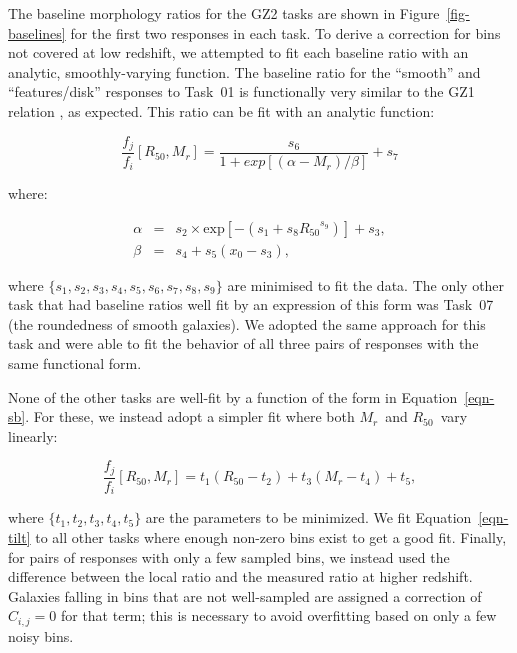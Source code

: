 \documentclass[useAMS,usenatbib]{mn2e}
\newcommand{\mr}{$M_r$}
\newcommand{\rfifty}{$R_{50}$}
\begin{document}
The baseline morphology ratios for the GZ2 tasks are shown in Figure~\ref{fig-baselines} for the first two responses in each task. To derive a correction for bins not covered at low redshift, we attempted to fit each baseline ratio with an analytic, smoothly-varying function. The baseline ratio for the ``smooth'' and ``features/disk'' responses to Task~01 is functionally very similar to the GZ1 relation \citep[Figure~A5 in][]{bam09}, as expected. This ratio can be fit with an analytic function: 

\begin{equation}
\frac{f_j}{f_i}[R_{50},M_r] = \frac{s_6}{1 + exp[(\alpha - M_r)/\beta]} + s_7
\label{eqn-sb}
\end{equation}

\noindent where:

\begin{eqnarray}
\alpha &=& s_2\times\text{exp}[{-\left(s_1 + s_8{R_{50}}^{s_9}\right)}] + s_3, \\
\beta  &=& s_4 + s_5(x_0 - s_3),
\end{eqnarray}

\noindent where $\{s_1,s_2,s_3,s_4,s_5,s_6,s_7,s_8,s_9\}$ are minimised to fit the data. The only other task that had baseline ratios well fit by an expression of this form was Task~07 (the roundedness of smooth galaxies). We adopted the same approach for this task and were able to fit the behavior of all three pairs of responses with the same functional form. 

None of the other tasks are well-fit by a function of the form in Equation~\ref{eqn-sb}. For these, we instead adopt a simpler fit where both \mr~and \rfifty~vary linearly:

\begin{equation}
\frac{f_j}{f_i}[R_{50},M_r] = t_1(R_{50} - t_2) + t_3(M_r - t_4) + t_5,
\label{eqn-tilt}
\end{equation}

\noindent where $\{t_1,t_2,t_3,t_4,t_5\}$ are the parameters to be minimized. We fit Equation~\ref{eqn-tilt} to all other tasks where enough non-zero bins exist to get a good fit. Finally, for pairs of responses with only a few sampled bins, we instead used the difference between the local ratio and the measured ratio at higher redshift. Galaxies falling in bins that are not well-sampled are assigned a correction of $C_{i,j}=0$ for that term; this is necessary to avoid overfitting based on only a few noisy bins. 

\end{document}
